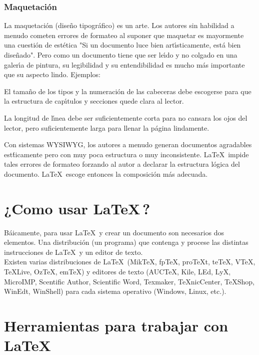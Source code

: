 \subsubsection{Maquetaci\'on}
La maquetaci\'on (dise\~no tipogr\'afico) es un arte. Los autores sin habilidad a menudo cometen errores de formateo al suponer que maquetar es mayormente una cuesti\'on de est\'etica "Si un documento luce bien art\'{\i}sticamente, est\'a bien dise\~nado". Pero como un documento tiene que ser le\'{\i}do y no colgado en una galer\'{\i}a de pintura, su legibilidad y su entendibilidad es mucho m\'as importante que su aspecto lindo. Ejemplos:
\begin{lista}
\item El tama\~no de los tipos y la numeraci\'on de las cabeceras debe escogerse para que la estructura de cap\'{\i}tulos y secciones quede clara al lector.
\item La longitud de l\'{\i}nea debe ser suficientemente corta para no cansara los ojos del lector, pero suficientemente larga para llenar la p\'agina lindamente.
\item Con sistemas WYSIWYG, los autores a menudo generan documentos
agradables est\'ticamente pero con muy poca estructura o muy inconsistente. \LaTeX\, impide tales errores de formateo forzando al autor a declarar la estructura l\'ogica del documento. \LaTeX\, escoge entonces la composici\'on m\'as adecuada.
\end{lista}

\section{¿Como usar \LaTeX\,?}
B\'aicamente, para usar \LaTeX\, y crear un documento son necesarios dos elementos. Una distribuci\'on (un programa) que contenga y procese  las distintas instrucciones de \LaTeX\, y un editor de texto.\\
Existen varias distribuciones de \LaTeX\, (MikTeX, fpTeX, proTeXt, teTeX, VTeX, TeXLive, OzTeX, emTeX) y editores de texto (AUCTeX, Kile, LEd, LyX, MicroIMP, Scentific Author, Scientific Word, Texmaker, TeXnicCenter, TeXShop, WinEdt, WinShell) para cada sistema operativo (Windows, Linux, etc.).

\section{Herramientas para trabajar con \LaTeX}

